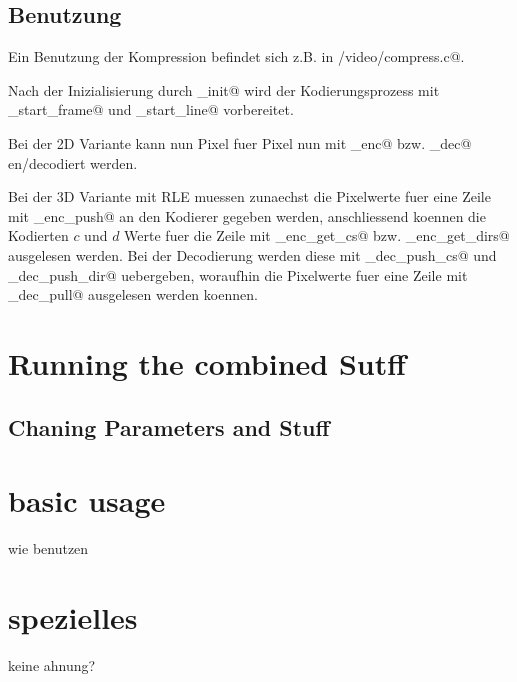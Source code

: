 \subsection{Benutzung}
Ein Benutzung der Kompression befindet sich z.B. in \verb@board/video/compress.c@.

Nach der Inizialisierung durch \lstinline@cmpr_init@ 
wird der Kodierungsprozess mit \lstinline@cmpr_start_frame@ und
\lstinline@cmpr_start_line@ vorbereitet.

Bei der 2D Variante kann nun Pixel fuer Pixel nun mit 
\lstinline@cmpr_enc@ bzw. \lstinline@cmpr_dec@ en/decodiert werden.

Bei der 3D Variante mit RLE muessen zunaechst die Pixelwerte fuer eine Zeile mit
_enc_push@ an den Kodierer gegeben werden, anschliessend 
koennen die Kodierten $c$ und $d$ Werte fuer die Zeile 
mit _enc_get_cs@ bzw. _enc_get_dirs@ ausgelesen werden.
Bei der Decodierung werden diese mit _dec_push_cs@ und 
_dec_push_dir@ uebergeben, woraufhin die Pixelwerte
fuer eine Zeile mit _dec_pull@ ausgelesen werden koennen.

\section{Running the combined Sutff}

\subsection{Chaning Parameters and Stuff}

\section{basic usage}
wie benutzen

\section{spezielles}
keine ahnung?

